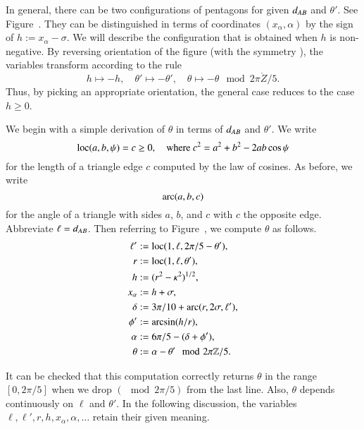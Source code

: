 
In general, there can be two configurations of pentagons for given
$d_{AB}$ and $\theta'$. See Figure~.  They can be
distinguished in terms of coordinates $(x_\alpha,\alpha)$ by the sign
of $h := x_\alpha-\sigma$.  We will describe the configuration that is
obtained when $h$ is non-negative.  By reversing orientation of the
figure (with the symmetry ), the variables transform
according to the rule
\[
h \mapsto -h,\quad 
\theta' \mapsto -\theta',
\quad 
\theta\mapsto -\theta \mod 2\pi\ring{Z}/5.
\]
Thus, by picking an appropriate orientation, the general case reduces
to the case $h\ge0$.

We begin with a simple derivation of $\theta$ in terms of
$d_{AB}$ and $\theta'$.  We write
\[
{\operatorname{loc}}(a,b,\psi) = c\ge 0,\quad 
\text{where } c^2 = a^2 + b^2 - 2ab \cos\psi
\]
for the length of a triangle edge $c$ computed by the law of cosines.
As before, we write
\[
\operatorname{arc}(a,b,c)
\]
for the angle of a triangle with sides $a$, $b$, and $c$ with $c$ the
opposite edge.  Abbreviate $\ell = d_{AB}$.  Then referring to
Figure~, we compute $\theta$ as follows.
\begin{align*}
\ell' &:= {\operatorname{loc}}(1,\ell,2\pi/5 - \theta'),\\
r &:= {\operatorname{loc}}(1,\ell,\theta'),\\
h &:= (r^2 -\kappa^2)^{1/2},\\
x_\alpha & := h + \sigma,\\
\delta & := 3\pi/10 + \operatorname{arc}(r,2\sigma,\ell'),\\
\phi' &:= \arcsin (h/r),\\
\alpha &:= 6\pi/5 - (\delta+\phi'),\\
\theta &:= \alpha - \theta' \mod 2\pi\mathbb{Z}/5.
\end{align*}


It can be checked that this computation correctly returns $\theta$ in
the range $[0,2\pi/5]$ when we drop $(\mod 2\pi/5)$ from the last
line.  Also, $\theta$ depends continuously on $\ell$ and $\theta'$.
In the following discussion, the variables
$\ell,\ell',r,h,x_\alpha,\alpha,\ldots$ retain their given meaning.

